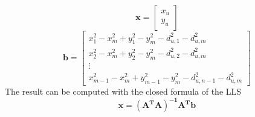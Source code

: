 \documentclass[12pt,twoside]{report}
\begin{document}
\begin{equation}
    \mathbf{x}=\begin{bmatrix}
    x_u\\
    y_u
    \end{bmatrix}
\end{equation}
\begin{equation}
    \mathbf{b}=\begin{bmatrix}
        x_{1}^2-x_m^2+y_{1}^2-y_m^2-d_{u,1}^2-d^2_{u,m}\\
        x_{2}^2-x_m^2+y_{2}^2-y_m^2-d_{u,2}^2-d^2_{u,m}\\
        \vdots\\
        x_{m-1}^2-x_m^2+y_{m-1}^2-y_m^2-d_{u,n-1}^2-d^2_{u,m}
    \end{bmatrix}
\end{equation}
The result can be computed with the closed formula of the LLS
\begin{equation}
    \mathbf{x}=\mathbf{(A^TA)^{-1}A^Tb}
\end{equation}
\clearpage
\end{document}
